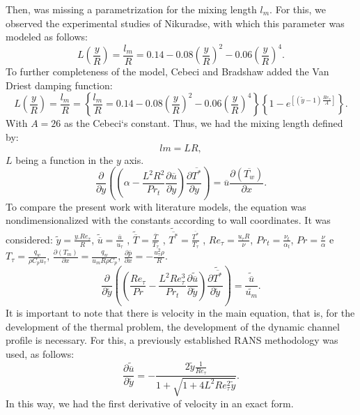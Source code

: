\documentclass[10pt]{article} %
\begin{document}
Then, was missing a parametrization for the mixing length $ l_m $. For this, we observed the experimental studies of Nikuradse, with which this parameter was modeled as follows:
\begin{equation}
L\left(\frac{y}{R}\right) = \frac{l_m}{R} = 0.14 - 0.08 \left(\frac{y}{R}\right)^2 - 0.06\left(\frac{y}{R}\right)^4.
\end{equation}
To further completeness of the model, Cebeci and Bradshaw added the Van Driest damping function:
\begin{equation}
L\left(\frac{y}{R}\right)  = \frac{l_m}{R} = \left\{\frac{l_m}{R} = 0.14 - 0.08 \left(\frac{y}{R}\right)^2 - 0.06\left(\frac{y}{R}\right)^4\right\}\left\{  1 - e^{[(\tilde{y} - 1) \frac{Re_\tau}{A}]}\right\}.
\end{equation}
With $A = 26$ as the Cebeci`s constant. Thus, we had the mixing length defined by:
\begin{equation}
lm = L R,
\end{equation}
$ L $ being a function in the $ y $ axis.
\begin{equation}\label{cebeciconstant}
{\frac{\partial{}}{\partial{y}}} \left( \left( \alpha   
- \frac{{L}^2 R ^2}{Pr_t}\frac{\partial \overline{u}}{\partial y} \right) \frac{\partial \overline{T^\ast}}{\partial y} \right)
= 
\overline{u}\frac{\partial{}\left(\overline{T_w}\right)  }{\partial{x}}.
\end{equation}
 To compare the present work with literature models, the equation was nondimensionalized with the constants according to wall coordinates. It was considered: $ \tilde{y} = \frac{y . Re_\tau}{R} $, $ \tilde{\overline{u}} = \frac{\overline{u}}{u_\tau} $ , $ \tilde{\overline{T}} = \frac{\overline{T}}{T_\tau} $ , $ \tilde{\overline{T^\ast}} = \frac{\overline{T^\ast}}{T_\tau} $ , $Re_\tau = \frac{u_\tau R}{\nu}$, $Pr_t = \frac{\nu_t}{\alpha_t}$, $Pr = \frac{\nu}{\alpha}$ e $T_\tau = \frac{q_w}{\rho C_p u_\tau}$, $\frac{\partial{\left(T_m\right)}}{\partial{x}} = \frac{q_w}{u_m  R \rho  C_p } $, $\frac{\partial \overline{p}}{\partial x} = - \frac{u_\tau^2 \rho}{R} $.
\\
\begin{equation}
{\frac{\partial{}}{\partial{\tilde{y}}}} \left( \left( \frac{Re_\tau}{Pr}   
- \frac{{L}^2 Re_\tau ^3}{Pr_t}\frac{\partial \tilde{\overline{u}}}{\partial \tilde{y}} \right) \frac{\partial \tilde{\overline{T^\ast}}}{\partial \tilde{y}} \right)
= 
\frac{\tilde{\overline{u}}}{\tilde{u_m}}.
\end{equation}
It is important to note that there is velocity in the main equation, that is, for the development of the thermal problem, the development of the dynamic channel profile is necessary. For this, a previously established RANS methodology \cite{Luigi} was used, as follows:
\begin{equation}
\frac{\partial \tilde{\overline{u}}}{\partial \tilde{y}} = - \frac{2 \tilde{y} \frac{1}{Re_\tau} }{ 1 + \sqrt{ 1 + 4 L ^2 Re_\tau ^2 \tilde{y}}}.
\end{equation}		
In this way, we had the first derivative of velocity in an exact form.
\end{document}
